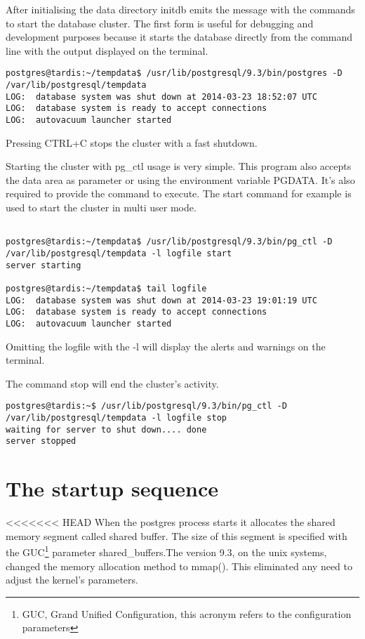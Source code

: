 After initialising the data directory initdb emits the message with the commands to start the 
database cluster. The first form is useful for debugging and development purposes because it starts 
the database directly from the command line with the output displayed on the terminal. 

\begin{verbatim}
postgres@tardis:~/tempdata$ /usr/lib/postgresql/9.3/bin/postgres -D 
/var/lib/postgresql/tempdata
LOG:  database system was shut down at 2014-03-23 18:52:07 UTC
LOG:  database system is ready to accept connections
LOG:  autovacuum launcher started

\end{verbatim}

Pressing CTRL+C stops the cluster with a fast shutdown.\newline

Starting the cluster with pg\_ctl usage is very simple. This program also accepts the data area as 
parameter or using the environment variable PGDATA. It's also required to provide the command to 
execute. The start command for example is used to start the cluster in multi user mode.

\begin{verbatim}

postgres@tardis:~/tempdata$ /usr/lib/postgresql/9.3/bin/pg_ctl -D 
/var/lib/postgresql/tempdata -l logfile start
server starting

postgres@tardis:~/tempdata$ tail logfile 
LOG:  database system was shut down at 2014-03-23 19:01:19 UTC
LOG:  database system is ready to accept connections
LOG:  autovacuum launcher started

\end{verbatim}
Omitting the logfile with the -l will display the alerts and warnings on the terminal.

The command stop will end the cluster's activity.

\begin{verbatim}
postgres@tardis:~$ /usr/lib/postgresql/9.3/bin/pg_ctl -D 
/var/lib/postgresql/tempdata -l logfile stop
waiting for server to shut down.... done
server stopped
\end{verbatim}

\section{The startup sequence}
\label{sec:STARTUP}

<<<<<<< HEAD
When the postgres process starts it allocates the shared memory segment called shared buffer. The
size of this segment is specified with the GUC\footnote{GUC, Grand Unified Configuration, this 
acronym refers to the configuration parameters} parameter shared\_buffers.The
version 9.3, on the
unix systems, changed the memory allocation method to mmap(). This eliminated any need to adjust
the kernel's parameters.

